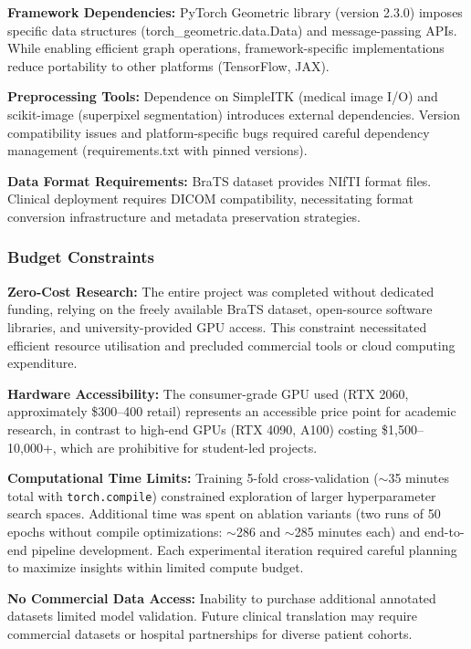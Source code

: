 \documentclass{article}
\begin{document}
\textbf{Framework Dependencies:} PyTorch Geometric library (version 2.3.0) imposes specific data structures (torch\_geometric.data.Data) and message-passing APIs. While enabling efficient graph operations, framework-specific implementations reduce portability to other platforms (TensorFlow, JAX).

\textbf{Preprocessing Tools:} Dependence on SimpleITK (medical image I/O) and scikit-image (superpixel segmentation) introduces external dependencies. Version compatibility issues and platform-specific bugs required careful dependency management (requirements.txt with pinned versions).

\textbf{Data Format Requirements:} BraTS dataset provides NIfTI format files. Clinical deployment requires DICOM compatibility, necessitating format conversion infrastructure and metadata preservation strategies.

\subsubsection{Budget Constraints}

\textbf{Zero-Cost Research:} The entire project was completed without dedicated funding, relying on the freely available BraTS dataset, open-source software libraries, and university-provided GPU access. This constraint necessitated efficient resource utilisation and precluded commercial tools or cloud computing expenditure.

\textbf{Hardware Accessibility:} The consumer-grade GPU used (RTX 2060, approximately \$300--400 retail) represents an accessible price point for academic research, in contrast to high-end GPUs (RTX 4090, A100) costing \$1,500--10,000+, which are prohibitive for student-led projects.

\textbf{Computational Time Limits:} Training 5-fold cross-validation ($\sim$35 minutes total with \texttt{torch.compile}) constrained exploration of larger hyperparameter search spaces. Additional time was spent on ablation variants (two runs of 50 epochs without compile optimizations: $\sim$286 and $\sim$285 minutes each) and end-to-end pipeline development. Each experimental iteration required careful planning to maximize insights within limited compute budget.

\textbf{No Commercial Data Access:} Inability to purchase additional annotated datasets limited model validation. Future clinical translation may require commercial datasets or hospital partnerships for diverse patient cohorts.
\end{document}

